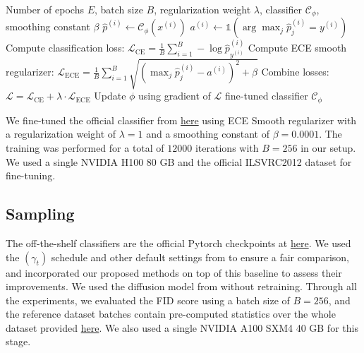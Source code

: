 \documentclass{article}
\begin{document}
\begin{algorithm}
\caption{ECE Smooth Fine-Tuning}
\label{alg:ece-smooth-finetune}
\begin{algorithmic}[1]
\Require Number of epochs $E$, batch size $B$, regularization weight $\lambda$, classifier $\mathcal{C}_\phi$, smoothing constant $\beta$
        \State $\hat{p}^{(i)} \leftarrow \mathcal{C}_\phi(x^{(i)})$ 
        \State $a^{(i)} \leftarrow \mathbb{1}\left( \arg\max_j \hat{p}^{(i)}_j = y^{(i)} \right)$ 
        \State Compute classification loss: 
        \State \hspace{\algorithmicindent} $\mathcal{L}_{\text{CE}} = \frac{1}{B} \sum_{i=1}^B -\log \hat{p}^{(i)}_{y^{(i)}}$
        \State Compute ECE smooth regularizer:
        \State \hspace{\algorithmicindent} $\mathcal{L}_{\mathrm{ECE}} = \frac{1}{B} \sum_{i=1}^{B} \sqrt{ \left( \max_j \hat{p}^{(i)}_j - a^{(i)} \right)^2 + \beta }$
        \State Combine losses: $\mathcal{L} = \mathcal{L}_{\text{CE}} + \lambda \cdot \mathcal{L}_{\mathrm{ECE}}$
        \State Update $\phi$ using gradient of $\mathcal{L}$
    \EndFor
\EndFor
\State \Return fine-tuned classifier $\mathcal{C}_\phi$
\end{algorithmic}
\end{algorithm}
We fine-tuned the official \cite{dhariwal2021diffusion} classifier from \href{https://openaipublic.blob.core.windows.net/diffusion/jul-2021/128x128_classifier.pt}{here} using ECE Smooth regularizer with a regularization weight of $\lambda = 1$ and a smoothing constant of $\beta = 0.0001$. The training was performed for a total of $12000$ iterations with $B=256$ in our setup. We used a single NVIDIA H100 80 GB and the official ILSVRC2012 dataset for fine-tuning.




\subsection{Sampling}
The off-the-shelf classifiers are the official Pytorch checkpoints at \href{https://download.pytorch.org/models/resnet50-11ad3fa6.pth}{here}. We used the $(\gamma_t)$ schedule and other default settings from \cite{ma2023elucidating} to ensure a fair comparison, and incorporated our proposed methods on top of this baseline to assess their improvements. We used the diffusion model from \cite{dhariwal2021diffusion} without retraining. Through all the experiments, we evaluated the FID score using a batch size of $B=256$, and the reference dataset batches contain pre-computed statistics over the whole dataset provided \href{https://github.com/openai/guided-diffusion/tree/main/evaluations}{here}. We also used a single NVIDIA A100 SXM4 40 GB for this stage. 
\end{document}
